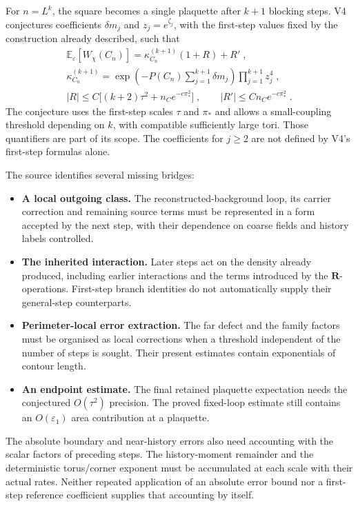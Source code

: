 \documentclass[11pt,a4paper]{article}
\begin{document}
For $n=L^k$, the square becomes a single plaquette after $k+1$ blocking steps. V4 conjectures coefficients $\delta m_j$ and $z_j=e^{\zeta_j}$, with the first-step values fixed by the construction already described, such that
\begin{equation*}
    \begin{gathered}
        \mathbb E_\varepsilon[W_\chi(C_n)] = \kappa^{(k+1)}_{C_n}(1+R)+R'\;,\\
        \kappa^{(k+1)}_{C_n} = \exp \left(-P(C_n)\sum_{j=1}^{k+1}\delta m_j\right) \prod_{j=1}^{k+1}z_j^4 \; , \\
        |R|\leqslant C\bigl[(k+2)\tau^2+n_Ce^{-c\pi_*^2}\bigr] \; , \qquad |R'|\leqslant Cn_Ce^{-c\pi_*^2} \; .
    \end{gathered}
\end{equation*}
The conjecture uses the first-step scales $\tau$ and $\pi_*$ and allows a small-coupling threshold depending on $k$, with compatible sufficiently large tori. Those quantifiers are part of its scope. The coefficients for $j \geqslant 2$ are not defined by V4's first-step formulas alone.

The source identifies several missing bridges:
\begin{itemize}
    \item \textbf{A local outgoing class.} The reconstructed-background loop, its carrier correction and remaining source terms must be represented in a form accepted by the next step, with their dependence on coarse fields and history labels controlled.
    \item \textbf{The inherited interaction.} Later steps act on the density already produced, including earlier interactions and the terms introduced by the $\mathbf R$-operations. First-step branch identities do not automatically supply their general-step counterparts.
    \item \textbf{Perimeter-local error extraction.} The far defect and the family factors must be organised as local corrections when a threshold independent of the number of steps is sought. Their present estimates contain exponentials of contour length.
    \item \textbf{An endpoint estimate.} The final retained plaquette expectation needs the conjectured $O(\tau^2)$ precision. The proved fixed-loop estimate still contains an $O(\varepsilon_1)$ area contribution at a plaquette.
\end{itemize}

The absolute boundary and near-history errors also need accounting with the scalar factors of preceding steps. The history-moment remainder and the deterministic torus/corner exponent must be accumulated at each scale with their actual rates. Neither repeated application of an absolute error bound nor a first-step reference coefficient supplies that accounting by itself.
\end{document}
